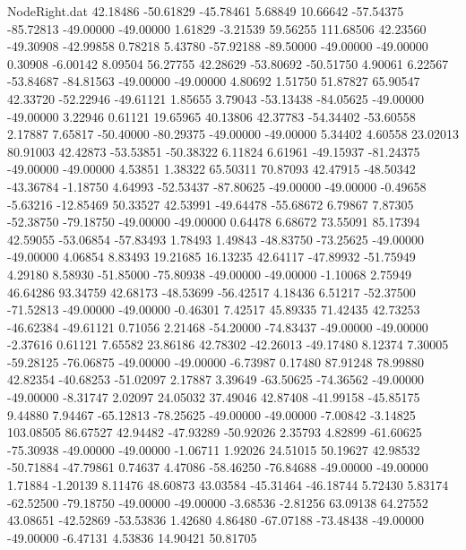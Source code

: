 \begin{filecontents}{NodeRight.dat}
  42.18486  -50.61829  -45.78461     5.68849   10.66642  -57.54375  -85.72813  -49.00000  -49.00000    1.61829   -3.21539   59.56255  111.68506
  42.23560  -49.30908  -42.99858     0.78218    5.43780  -57.92188  -89.50000  -49.00000  -49.00000    0.30908   -6.00142    8.09504   56.27755
  42.28629  -53.80692  -50.51750     4.90061    6.22567  -53.84687  -84.81563  -49.00000  -49.00000    4.80692    1.51750   51.87827   65.90547
  42.33720  -52.22946  -49.61121     1.85655    3.79043  -53.13438  -84.05625  -49.00000  -49.00000    3.22946    0.61121   19.65965   40.13806
  42.37783  -54.34402  -53.60558     2.17887    7.65817  -50.40000  -80.29375  -49.00000  -49.00000    5.34402    4.60558   23.02013   80.91003
  42.42873  -53.53851  -50.38322     6.11824    6.61961  -49.15937  -81.24375  -49.00000  -49.00000    4.53851    1.38322   65.50311   70.87093
  42.47915  -48.50342  -43.36784    -1.18750    4.64993  -52.53437  -87.80625  -49.00000  -49.00000   -0.49658   -5.63216  -12.85469   50.33527
  42.53991  -49.64478  -55.68672     6.79867    7.87305  -52.38750  -79.18750  -49.00000  -49.00000    0.64478    6.68672   73.55091   85.17394
  42.59055  -53.06854  -57.83493     1.78493    1.49843  -48.83750  -73.25625  -49.00000  -49.00000    4.06854    8.83493   19.21685   16.13235
  42.64117  -47.89932  -51.75949     4.29180    8.58930  -51.85000  -75.80938  -49.00000  -49.00000   -1.10068    2.75949   46.64286   93.34759
  42.68173  -48.53699  -56.42517     4.18436    6.51217  -52.37500  -71.52813  -49.00000  -49.00000   -0.46301    7.42517   45.89335   71.42435
  42.73253  -46.62384  -49.61121     0.71056    2.21468  -54.20000  -74.83437  -49.00000  -49.00000   -2.37616    0.61121    7.65582   23.86186
  42.78302  -42.26013  -49.17480     8.12374    7.30005  -59.28125  -76.06875  -49.00000  -49.00000   -6.73987    0.17480   87.91248   78.99880
  42.82354  -40.68253  -51.02097     2.17887    3.39649  -63.50625  -74.36562  -49.00000  -49.00000   -8.31747    2.02097   24.05032   37.49046
  42.87408  -41.99158  -45.85175     9.44880    7.94467  -65.12813  -78.25625  -49.00000  -49.00000   -7.00842   -3.14825  103.08505   86.67527
  42.94482  -47.93289  -50.92026     2.35793    4.82899  -61.60625  -75.30938  -49.00000  -49.00000   -1.06711    1.92026   24.51015   50.19627
  42.98532  -50.71884  -47.79861     0.74637    4.47086  -58.46250  -76.84688  -49.00000  -49.00000    1.71884   -1.20139    8.11476   48.60873
  43.03584  -45.31464  -46.18744     5.72430    5.83174  -62.52500  -79.18750  -49.00000  -49.00000   -3.68536   -2.81256   63.09138   64.27552
  43.08651  -42.52869  -53.53836     1.42680    4.86480  -67.07188  -73.48438  -49.00000  -49.00000   -6.47131    4.53836   14.90421   50.81705

\end{filecontents}
